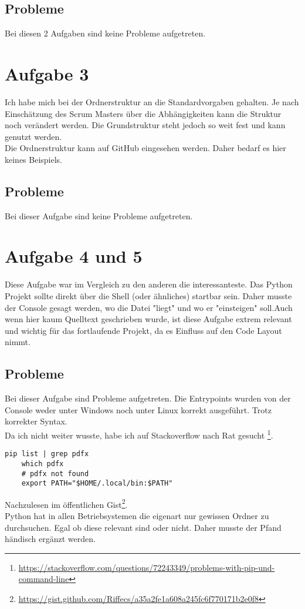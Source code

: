 \documentclass[fleqn,10pt]{olplainarticle}
\begin{document}
\subsection*{Probleme}
Bei diesen 2 Aufgaben sind keine Probleme aufgetreten.


\clearpage

\section*{Aufgabe 3}
Ich habe mich bei der Ordnerstruktur an die Standardvorgaben gehalten. Je nach Einschätzung des Scrum Masters über die Abhängigkeiten kann die Struktur noch verändert werden. Die Grundstruktur steht jedoch so weit fest und kann genutzt werden. \\
Die Ordnerstruktur kann auf GitHub eingesehen werden. Daher bedarf es hier keines Beispiels. 


\subsection*{Probleme}
Bei dieser Aufgabe sind keine Probleme aufgetreten.



\section*{Aufgabe 4 und 5}
Diese Aufgabe war im Vergleich zu den anderen die interessanteste. Das Python Projekt sollte direkt über die Shell (oder ähnliches) startbar sein. Daher musste der Console gesagt werden, wo die Datei "liegt" und wo er "einsteigen" soll.Auch wenn hier kaum Quelltext geschrieben wurde, ist diese Aufgabe extrem relevant und wichtig für das fortlaufende Projekt, da es Einfluss auf den Code Layout nimmt.


\subsection*{Probleme}
Bei dieser Aufgabe sind Probleme aufgetreten. Die Entrypoints wurden von der Console weder unter Windows noch unter Linux korrekt ausgeführt. Trotz korrekter Syntax. \\
Da ich nicht weiter wusste, habe ich auf Stackoverflow nach Rat gesucht \footnote{\url{https://stackoverflow.com/questions/72243349/problems-with-pip-und-command-line}}.

\begin{lstlisting}[frame=single] 
	pip list | grep pdfx
	which pdfx
	# pdfx not found
	export PATH="$HOME/.local/bin:$PATH"
\end{lstlisting}
Nachzulesen im öffentlichen Gist\footnote{\url{https://gist.github.com/Riffecs/a35a2fe1a608a245fc6f770171b2e0f8}}. \vspace{0.2cm} \\
Python hat in allen Betriebsystemen die eigenart nur gewissen Ordner zu durchsuchen. Egal ob diese relevant sind oder nicht. Daher musste der Pfand händisch ergänzt werden.
\end{document}
